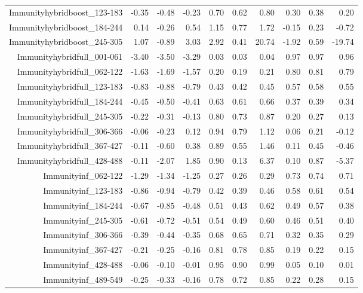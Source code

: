 \begin{table}[ht]
\begin{tabular}{rrrrrrrrrr}
  Immunityhybridboost\_123-183 & -0.35 & -0.48 & -0.23 & 0.70 & 0.62 & 0.80 & 0.30 & 0.38 & 0.20 \\ 
  Immunityhybridboost\_184-244 & 0.14 & -0.26 & 0.54 & 1.15 & 0.77 & 1.72 & -0.15 & 0.23 & -0.72 \\ 
  Immunityhybridboost\_245-305 & 1.07 & -0.89 & 3.03 & 2.92 & 0.41 & 20.74 & -1.92 & 0.59 & -19.74 \\ 
  Immunityhybridfull\_001-061 & -3.40 & -3.50 & -3.29 & 0.03 & 0.03 & 0.04 & 0.97 & 0.97 & 0.96 \\ 
  Immunityhybridfull\_062-122 & -1.63 & -1.69 & -1.57 & 0.20 & 0.19 & 0.21 & 0.80 & 0.81 & 0.79 \\ 
  Immunityhybridfull\_123-183 & -0.83 & -0.88 & -0.79 & 0.43 & 0.42 & 0.45 & 0.57 & 0.58 & 0.55 \\ 
  Immunityhybridfull\_184-244 & -0.45 & -0.50 & -0.41 & 0.63 & 0.61 & 0.66 & 0.37 & 0.39 & 0.34 \\ 
  Immunityhybridfull\_245-305 & -0.22 & -0.31 & -0.13 & 0.80 & 0.73 & 0.87 & 0.20 & 0.27 & 0.13 \\ 
  Immunityhybridfull\_306-366 & -0.06 & -0.23 & 0.12 & 0.94 & 0.79 & 1.12 & 0.06 & 0.21 & -0.12 \\ 
  Immunityhybridfull\_367-427 & -0.11 & -0.60 & 0.38 & 0.89 & 0.55 & 1.46 & 0.11 & 0.45 & -0.46 \\ 
  Immunityhybridfull\_428-488 & -0.11 & -2.07 & 1.85 & 0.90 & 0.13 & 6.37 & 0.10 & 0.87 & -5.37 \\ 
  Immunityinf\_062-122 & -1.29 & -1.34 & -1.25 & 0.27 & 0.26 & 0.29 & 0.73 & 0.74 & 0.71 \\ 
  Immunityinf\_123-183 & -0.86 & -0.94 & -0.79 & 0.42 & 0.39 & 0.46 & 0.58 & 0.61 & 0.54 \\ 
  Immunityinf\_184-244 & -0.67 & -0.85 & -0.48 & 0.51 & 0.43 & 0.62 & 0.49 & 0.57 & 0.38 \\ 
  Immunityinf\_245-305 & -0.61 & -0.72 & -0.51 & 0.54 & 0.49 & 0.60 & 0.46 & 0.51 & 0.40 \\ 
  Immunityinf\_306-366 & -0.39 & -0.44 & -0.35 & 0.68 & 0.65 & 0.71 & 0.32 & 0.35 & 0.29 \\ 
  Immunityinf\_367-427 & -0.21 & -0.25 & -0.16 & 0.81 & 0.78 & 0.85 & 0.19 & 0.22 & 0.15 \\ 
  Immunityinf\_428-488 & -0.06 & -0.10 & -0.01 & 0.95 & 0.90 & 0.99 & 0.05 & 0.10 & 0.01 \\ 
  Immunityinf\_489-549 & -0.25 & -0.33 & -0.16 & 0.78 & 0.72 & 0.85 & 0.22 & 0.28 & 0.15 \\ 

\end{tabular}
\end{table}

